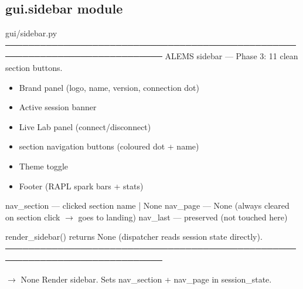 \documentclass[letterpaper,10pt,english]{sphinxmanual}
\begin{document}
\subsection{gui.sidebar module}
\label{\detokenize{gui.sidebar:module-gui.sidebar}}\label{\detokenize{gui.sidebar:gui-sidebar-module}}\label{\detokenize{gui.sidebar::doc}}
\sphinxAtStartPar
gui/sidebar.py
─────────────────────────────────────────────────────────────────────────────
A\sphinxhyphen{}LEMS sidebar — Phase 3: 11 clean section buttons.
\begin{description}
\begin{itemize}
\item {} 
\sphinxAtStartPar
Brand panel (logo, name, version, connection dot)

\item {} 
\sphinxAtStartPar
Active session banner

\item {} 
\sphinxAtStartPar
Live Lab panel (connect/disconnect)

\item {} 
 section navigation buttons (coloured dot + name)

\item {} 
\sphinxAtStartPar
Theme toggle

\item {} 
\sphinxAtStartPar
Footer (RAPL spark bars + stats)

\end{itemize}

\sphinxAtStartPar
nav\_section  — clicked section name | None
nav\_page     — None (always cleared on section click \(\rightarrow\) goes to landing)
nav\_last     — preserved (not touched here)

\end{description}

\sphinxAtStartPar
render\_sidebar() returns None (dispatcher reads session state directly).
─────────────────────────────────────────────────────────────────────────────

\begin{fulllineitems}
\label{\detokenize{gui.sidebar:gui.sidebar.render_sidebar}}
\pysigstartsignatures
\pysiglinewithargsret
{}
{}
{{ $\rightarrow$ None}}
\pysigstopsignatures
\sphinxAtStartPar
Render sidebar. Sets nav\_section + nav\_page in session\_state.

\end{fulllineitems}
\end{document}
